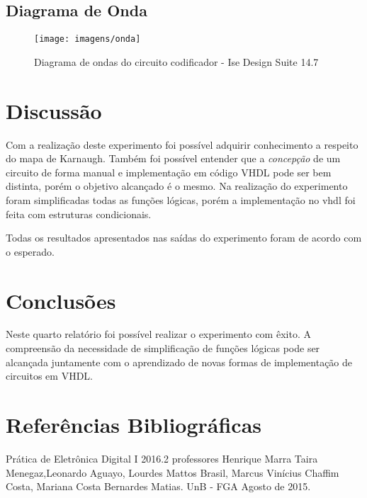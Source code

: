 \documentclass[12pts]{article}
\begin{document}
\newpage
\subsection{Diagrama de Onda}

\begin{figure}[!htb]
  \centering
  \texttt{[image: imagens/onda]}
  \caption{Diagrama de ondas do circuito codificador - Ise Design Suite 14.7}
  \label{figRotulo}
\end{figure}
\newpage

\section{Discussão}
\iffalse
Discussão sobre os resultados encontrados, comentando detalhadamente as medições realizadas e dando a devida interpretação destas, informando se os objetivos da experimento foram alcançados. Esta é uma das partes mais importantes do relatório: aqui, há oportunidade para expressar os conhecimentos adquiridos na prática e fazer a interrelação com os fundamentos teóricos.
\fi

	Com a realização deste experimento foi possível adquirir conhecimento a respeito do mapa de Karnaugh. Também foi possível entender que a \textit{concepção} de um circuito de forma manual e implementação em código VHDL pode ser bem distinta, porém o objetivo alcançado é o mesmo. Na realização do experimento foram simplificadas todas as funções lógicas, porém a implementação no vhdl foi feita com estruturas condicionais.

	Todas os resultados apresentados nas saídas do experimento foram de acordo com o esperado.

\section{Conclusões}
\iffalse
Conclusões, mostrando os êxitos e eventuais problemas encontrados na realização do experimento, indicando as limitações, apresentando recomendações e/ou sugestões.
\fi

	Neste quarto relatório foi possível realizar o experimento com êxito. A compreensão da necessidade de simplificação de funções lógicas pode ser alcançada juntamente com o aprendizado de novas formas de implementação de circuitos em VHDL.



\section{Referências Bibliográficas}
\iffalse
Referencias Bibliográficas, relacionadas e citadas de acordo com as normas da ABNT.
\fi
Prática de Eletrônica Digital I 2016.2 professores Henrique Marra Taira Menegaz,Leonardo Aguayo, Lourdes Mattos Brasil, Marcus Vinícius Chaffim Costa, Mariana Costa Bernardes Matias. UnB - FGA Agosto de 2015.

\iffalse
\section{Diagramas Esquemáticos}
Diagramas Esquemáticos. Todos os diagramas devem ser inseridos ao final do relatório em páginas separadas do texto, indicando a identificação do circuito, autor, revisor, versão e datas relevantes.
\fi
\newpage
\end{document}
